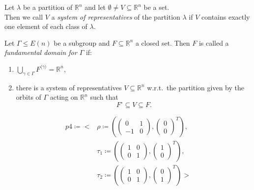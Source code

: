 \documentclass{beamer}
\theoremstyle{plain}
\newcommand\R{\mathbb R}
\begin{document}
\begin{frame}
    \begin{definition}\label{def:system-of-reps}
        Let $\lambda$ be a partition of $\R^n$ and let $\emptyset \neq V \subseteq \R^n$ be a set.\\ \pause
        Then we call $V$ a \emph{system of representatives} of the partition $\lambda$ if $V$ contains exactly one element of each class of $\lambda$.
    \end{definition} \pause

    \begin{definition}\label{def:fund-dom}
        Let $\Gamma \leq E(n)$ be a subgroup and $F \subseteq \R^n$ a closed set.
        Then $F$ is called a \emph{fundamental domain for $\Gamma$} if:\pause
        \begin{enumerate}[label=(\roman*)]
            \item $\bigcup_{\gamma \in \Gamma} F^{\langle \gamma \rangle} = \R^n$, \pause
            \item there is a system of representatives $V \subseteq \R^n$ w.r.t.\ the partition given by the orbits of $\Gamma$ acting on $\R^n$ such that $$F^\circ \subseteq V \subseteq F.$$
        \end{enumerate}
    \end{definition}
\end{frame}

\begin{frame}
    \begin{example}
        \begin{align*}
            p4 \coloneqq \Biggl<
            &\rho \coloneqq \left( \begin{pmatrix} 0 &1 \\ -1 &0\end{pmatrix}, \begin{pmatrix} 0 \\ 0 \end{pmatrix}^T\right),\\
            &\tau_1 \coloneqq \left( \begin{pmatrix} 1 &0 \\ 0 &1\end{pmatrix}, \begin{pmatrix} 1 \\ 0 \end{pmatrix}^T\right), \\
            &\tau_2 \coloneqq \left( \begin{pmatrix} 1 &0 \\ 0 &1\end{pmatrix}, \begin{pmatrix} 0 \\ 1 \end{pmatrix}^T\right) \Biggr>
        \end{align*}
    \end{example}
\end{frame}
\end{document}
